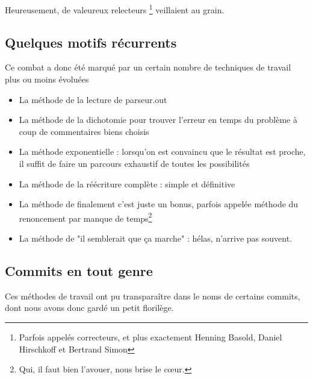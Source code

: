 \documentclass{article}
\begin{document}
	Heureusement, de valeureux relecteurs \footnote{Parfois appelés correcteurs, et plus exactement Henning Basold,
	Daniel Hirschkoff et 
	Bertrand Simon} veillaient au grain.

	\subsection{Quelques motifs récurrents}
	
		Ce combat a donc été marqué par un certain nombre de techniques de travail plus ou moins évoluées
		
		\begin{itemize}
			\item La méthode de la lecture de parseur.out
			\item La méthode de la dichotomie pour trouver l'erreur en temps  du problème à coup de commentaires biens choisis
			\item La méthode exponentielle : lorsqu'on est convaincu que le résultat est proche, il suffit de faire un parcours exhaustif de toutes les possibilités
			\item La méthode de la réécriture complète : simple et définitive
			\item La méthode de finalement c'est juste un bonus, parfois appelée méthode du renoncement par manque de temps\footnote{Qui, il faut bien l'avouer, nous brise le cœur.}
			\item La méthode de "il semblerait que ça marche" : hélas, n'arrive pas souvent.
		\end{itemize}
	
	\subsection{Commits en tout genre}
	
		Ces méthodes de travail ont pu transparaître dans le noms de certains commits, dont nous avons donc gardé un petit florilège.
		
\end{document}
